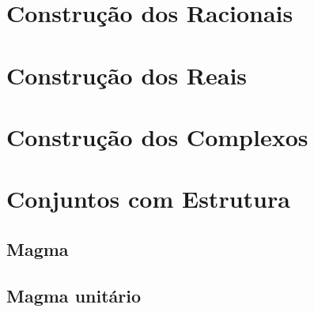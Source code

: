 \documentclass[twoside]{amsart}
\numberwithin{equation}{section}
\begin{document}


\section{Construção dos Racionais}



\section{Construção dos Reais}



\section{Construção dos Complexos}



\section{Conjuntos com Estrutura}

\subsection{Magma}

\subsection{Magma unitário}
\end{document}
